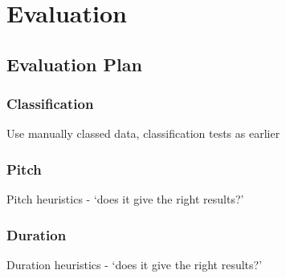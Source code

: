 \chapter{Evaluation}

\section{Evaluation Plan}


\subsection{Classification}
Use manually classed data, classification tests as earlier

\subsection{Pitch}
Pitch heuristics - `does it give the right results?'

\subsection{Duration}
Duration heuristics - `does it give the right results?'

\clearpage
